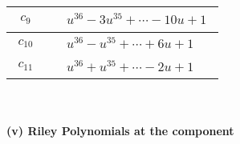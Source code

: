 \documentclass[1p]{elsarticle_modified}
\theoremstyle{definition}
\begin{document}
\begin{tabular}{m{50pt}|m{274pt}}
\hline $$\begin{aligned}c_{9}\end{aligned}$$&$\begin{aligned}
&u^{36}-3 u^{35}+\cdots-10 u+1
\end{aligned}$\\
\hline $$\begin{aligned}c_{10}\end{aligned}$$&$\begin{aligned}
&u^{36}- u^{35}+\cdots+6 u+1
\end{aligned}$\\
\hline $$\begin{aligned}c_{11}\end{aligned}$$&$\begin{aligned}
&u^{36}+u^{35}+\cdots-2 u+1
\end{aligned}$\\
\hline
\end{tabular}\\~\\
\newpage\renewcommand{\arraystretch}{1}
\flushleft \textbf{(v) Riley Polynomials at the component}\newline \\
\end{document}
